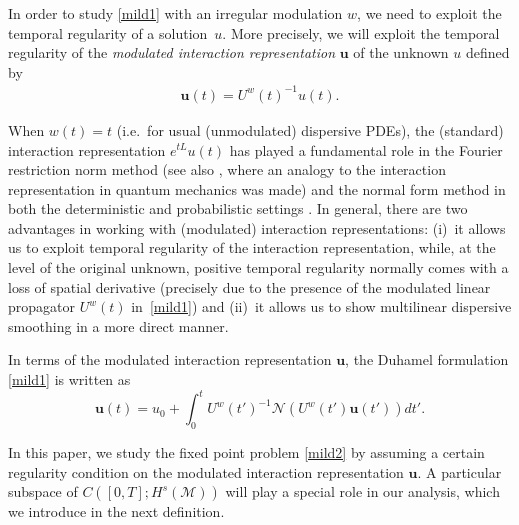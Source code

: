 \documentclass[letterpaper, 11pt,  reqno]{amsart}
\newcommand{\1}{\hspace{0.5mm}\text{I}\hspace{0.5mm}}
\newcommand{\noi}{\noindent}
\newcommand{\M}{\mathcal{M}}
\newcommand{\NN}{\mathcal{N}}
\newcommand{\uw}{U^w}
\newcommand{\uu}{\mathbf{u}}
\numberwithin{equation}{section}
\numberwithin{theorem}{section}
\begin{document}
In order to study \eqref{mild1} with an irregular modulation $w$, 
we  need to exploit the temporal regularity of a solution~$u$.
More precisely, 
we will exploit the temporal regularity 
of the 
{\it modulated interaction representation} 
$\uu$ of the unknown $u$ defined by 
\begin{align}
\uu(t)=\uw(t)^{-1}u(t).
\label{int1} 
\end{align}

\noi
When $w(t) = t$
(i.e.~for usual (unmodulated) dispersive PDEs), the (standard) interaction representation $e^{tL} u(t)$
has played a fundamental  role
in the Fourier restriction norm method
\cite{BO93, KT}
(see also \cite{GTV}, 
where an analogy
to the 
 interaction representation in quantum mechanics was made)
 and the normal form method 
 in both the deterministic and probabilistic settings
 \cite{BIT, KO, GKO, OTz, OST, OW}.
In general, there are two advantages
in working with (modulated) interaction representations:
(i)~it allows us to exploit temporal regularity of
the interaction representation,
while, at the level of the original unknown, positive temporal regularity normally comes 
with a loss of spatial derivative
(precisely due to 
the presence of 
the modulated linear propagator
$U^w(t)$
 in~\eqref{mild1})
 and 
(ii)~it allows us to show multilinear dispersive smoothing 
in a more direct manner.




In terms of the modulated interaction representation $\uu$, 
the Duhamel formulation \eqref{mild1}
is written as 
\begin{equation}
\uu(t) = u_0 + \int_0 ^t \uw(t')^{-1}\NN(\uw(t') \uu(t'))dt'.
\label{mild2}
\end{equation}


\noi
In this paper, we study the fixed point problem \eqref{mild2}
by assuming  a certain regularity condition 
on 
the modulated interaction representation $\uu$.
A particular subspace of $C([0,T];H^s(\M))$ will play a special role in our analysis, 
which we introduce in the next definition. 
\end{document}
